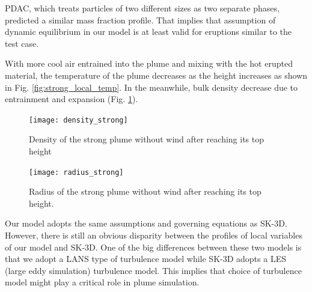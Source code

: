 \documentclass[gmd, manuscript]{copernicus}
\begin{document}
PDAC, which treats particles of two different sizes as two separate phases, predicted a similar mass fraction profile. That implies that assumption of dynamic equilibrium in our model is at least valid for eruptions similar to the test case.

With more cool air entrained into the plume and mixing with the hot erupted material, the temperature of the plume decreases as the height increases as shown in Fig. \ref{fig:strong_local_temp}. In the meanwhile, bulk density decrease due to entrainment and expansion (Fig. \ref{fig:strong_local_density}).
\begin{figure}
\center
\texttt{[image: density\_strong]}
\caption{Density of the strong plume without wind after reaching its top height}
\label{fig:strong_local_density}
\end{figure}
\begin{figure}
\center
\texttt{[image: radius\_strong]}
\caption{Radius of the strong plume without wind after reaching its top height.}
\label{fig:strong_local_radius}
\end{figure}
Our model adopts the same assumptions and governing equations as SK-3D. However, there is still an obvious disparity between the profiles of local variables of our model and SK-3D. One of the big differences between these two models is that we adopt a LANS type of turbulence model while SK-3D adopts a LES (large eddy simulation) turbulence model. This implies that choice of  turbulence model might play a critical role in plume simulation.
\end{document}
